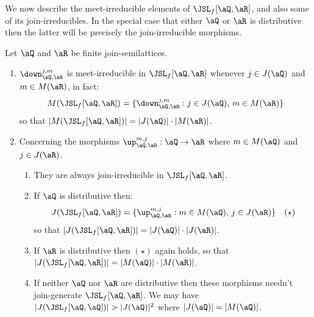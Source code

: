 \documentclass{article}
\begin{document}
We now describe the meet-irreducible elements of $\JSL_f[\aQ,\aR]$, and also some of its join-irreducibles. In the special case that either $\aQ$ or $\aR$ is distributive then the latter will be precisely the join-irreducible morphisms.

\begin{lemma}
\label{lem:hom_meet_join_irr}
\item
Let $\aQ$ and $\aR$ be finite join-semilattices.
\begin{enumerate}
\item
$\down_{\aQ,\aR}^{j,m}$ is meet-irreducible in $\JSL_f[\aQ,\aR]$ whenever $j \in J(\aQ)$ and $m \in M(\aR)$, in fact:
\[
M(\JSL_f[\aQ,\aR]) = \{ \down_{\aQ,\aR}^{j,m} : j \in J(\aQ), \, m \in M(\aR) \}
\]
so that $|M(\JSL_f[\aQ,\aR])| = |J(\aQ)| \cdot |M(\aR)|$.

\item
Concerning the morphisms $\up_{\aQ,\aR}^{m,j} : \aQ \to \aR$ where $m \in M(\aQ)$ and $j \in J(\aR)$.
\begin{enumerate}
\item
They are always join-irreducible in $\JSL_f[\aQ,\aR]$.

\item
If $\aQ$ is distributive then:
\[
J(\JSL_f[\aQ,\aR]) = \{ \up_{\aQ,\aR}^{m,j} : m \in M(\aQ), \, j \in J(\aR) \}
\quad
(\star)
\]
so that $|J(\JSL_f[\aQ,\aR])| = |J(\aQ)| \cdot |J(\aR)|$.
\item
If $\aR$ is distributive then $(\star)$ again holds, so that $|J(\JSL_f[\aQ,\aR])| = |M(\aQ)| \cdot |M(\aR)|$.
\item
If neither $\aQ$ nor $\aR$ are distributive then these morphisms needn't  join-generate $\JSL_f[\aQ,\aR]$. We may have $|J(\JSL_f[\aQ,\aQ])| > |J(\aQ)|^2$ where $|J(\aQ)| = |M(\aQ)|$.

\end{enumerate}

\end{enumerate}
\end{lemma}
\end{document}
